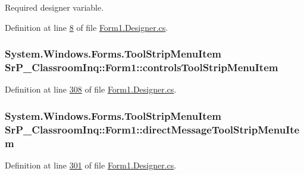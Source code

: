 \-Required designer variable. 



\-Definition at line \hyperlink{_form1_8_designer_8cs_source_l00008}{8} of file \hyperlink{_form1_8_designer_8cs_source}{\-Form1.\-Designer.\-cs}.

\hypertarget{class_sr_p___classroom_inq_1_1_form1_a06583fd3fb29ebc029293ca162e2848d}{
\subsubsection[{controls\-Tool\-Strip\-Menu\-Item}]{\setlength{\rightskip}{0pt plus 5cm}\-System.\-Windows.\-Forms.\-Tool\-Strip\-Menu\-Item {\bf \-Sr\-P\-\_\-\-Classroom\-Inq\-::\-Form1\-::controls\-Tool\-Strip\-Menu\-Item}}}
\label{class_sr_p___classroom_inq_1_1_form1_a06583fd3fb29ebc029293ca162e2848d}


\-Definition at line \hyperlink{_form1_8_designer_8cs_source_l00308}{308} of file \hyperlink{_form1_8_designer_8cs_source}{\-Form1.\-Designer.\-cs}.

\hypertarget{class_sr_p___classroom_inq_1_1_form1_ab3a4ceedac3b7ba0985ed1bf2d581848}{
\subsubsection[{direct\-Message\-Tool\-Strip\-Menu\-Item}]{\setlength{\rightskip}{0pt plus 5cm}\-System.\-Windows.\-Forms.\-Tool\-Strip\-Menu\-Item {\bf \-Sr\-P\-\_\-\-Classroom\-Inq\-::\-Form1\-::direct\-Message\-Tool\-Strip\-Menu\-Item}}}
\label{class_sr_p___classroom_inq_1_1_form1_ab3a4ceedac3b7ba0985ed1bf2d581848}


\-Definition at line \hyperlink{_form1_8_designer_8cs_source_l00301}{301} of file \hyperlink{_form1_8_designer_8cs_source}{\-Form1.\-Designer.\-cs}.


